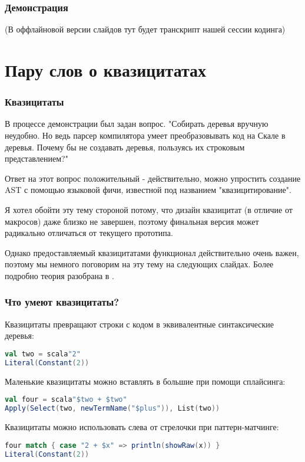 \documentclass[hyperref={bookmarks=false}]{beamer}
\begin{document}
\begin{frame}
\frametitle{Демонстрация}
(В оффлайновой версии слайдов тут будет транскрипт нашей сессии кодинга)
\end{frame}

\section{Пару слов о квазицитатах}

\begin{frame}[t,fragile]
\frametitle{Квазицитаты}

В процессе демонстрации был задан вопрос. "Собирать деревья вручную неудобно. Но ведь парсер компилятора умеет преобразовывать код на Скале в деревья. Почему бы не создавать деревья, пользуясь их строковым представлением?"

Ответ на этот вопрос положительный - действительно, можно упростить создание AST с помощью языковой фичи, известной под названием "квазицитирование". 

Я хотел обойти эту тему стороной потому, что дизайн квазицитат (в отличие от макросов) даже близко не завершен, поэтому финальная версия может радикально отличаться от текущего прототипа. 

Однако предоставляемый квазицитатами функционал действительно очень важен, поэтому мы немного поговорим на эту тему на следующих слайдах. Более подробно теория разобрана в .
\end{frame}

\begin{frame}[t,fragile]
\frametitle{Что умеют квазицитаты?}

Квазицитаты превращают строки с кодом в эквивалентные синтаксические деревья:

\begin{lstlisting}[language=scala]
val two = scala"2"
Literal(Constant(2))
\end{lstlisting}

Маленькие квазицитаты можно вставлять в большие при помощи сплайсинга:

\begin{lstlisting}[language=scala]
val four = scala"$two + $two"
Apply(Select(two, newTermName("$plus")), List(two))
\end{lstlisting}%

Квазицитаты можно использовать слева от стрелочки при паттерн-матчинге:

\begin{lstlisting}[language=scala]
four match { case "2 + $x" => println(showRaw(x)) }
Literal(Constant(2))
\end{lstlisting}%
\end{frame}
\end{document}
